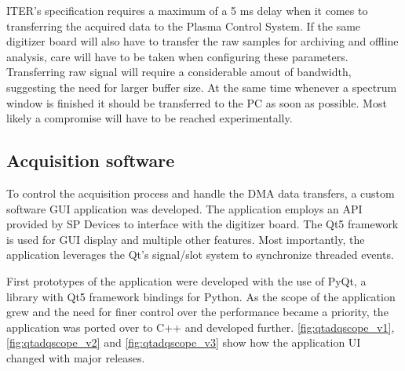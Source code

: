 ITER's specification requires a maximum of a 5 ms delay when it comes
to transferring the acquired data to the Plasma Control System.
If the same digitizer board will also have to transfer the raw
samples for archiving and offline analysis, care will have to 
be taken when configuring these parameters. Transferring raw signal
will require a considerable amout of bandwidth, suggesting the need for larger
buffer size. At the same time whenever a spectrum window is finished
it should be transferred to the PC as soon as possible.
Most likely a compromise will have to be reached experimentally.

\subsection{Acquisition software}

To control the acquisition process and handle the DMA data transfers,
a custom software GUI application was developed. The application
employs an API provided by SP Devices to interface with the digitizer board.
The Qt5 framework is used for GUI display and multiple other features.
Most importantly, the application leverages the Qt's signal/slot system 
to synchronize threaded events.


First prototypes of the application were developed with the use of PyQt, 
a library with Qt5 framework bindings for Python.
As the scope of the application grew
and the need for finer control over the performance became a priority,
the application was ported over to C++ and developed further.
\autoref{fig:qtadqscope_v1}, \autoref{fig:qtadqscope_v2} and
\autoref{fig:qtadqscope_v3} show how the application UI 
changed with major releases.


